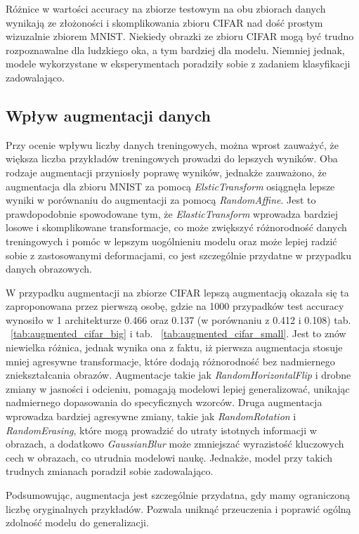 \documentclass[10pt]{article}
\begin{document}
Różnice w wartości accuracy na zbiorze testowym na obu zbiorach danych wynikają ze złożoności i skomplikowania zbioru CIFAR nad dość prostym wizuzalnie zbiorem MNIST.
Niekiedy obrazki ze zbioru CIFAR mogą być trudno rozpoznawalne dla ludzkiego oka, a tym bardziej dla modelu.
Niemniej jednak, modele wykorzystane w eksperymentach poradziły sobie z zadaniem klasyfikacji zadowalająco.

\subsection*{Wpływ augmentacji danych}
Przy ocenie wpływu liczby danych treningowych, można wprost zauważyć, że większa liczba przykładów treningowych prowadzi do lepszych wyników.
Oba rodzaje augmentacji przyniosły poprawę wyników, jednakże zauważono, że augmentacja dla zbioru MNIST za pomocą \textit{ElsticTransform} osiągnęła lepsze wyniki w porównaniu do augmentacji za pomocą \textit{RandomAffine}.
Jest to prawdopodobnie spowodowane tym, że \textit{ElasticTransform} wprowadza bardziej losowe i skomplikowane transformacje, co może zwiększyć różnorodność danych treningowych i pomóc w lepszym uogólnieniu modelu oraz może lepiej radzić sobie z zastosowanymi deformacjami, co jest szczególnie przydatne w przypadku danych obrazowych.

W przypadku augmentacji na zbiorze CIFAR lepszą augmentacją okazała się ta zaproponowana przez pierwszą osobę, gdzie na 1000 przypadków test accuracy wynosiło w 1 architekturze 0.466 oraz 0.137 (w porównaniu z 0.412 i 0.108) tab. ~\ref{tab:augmented_cifar_big} i tab. ~\ref{tab:augmented_cifar_small}.
Jest to znów niewielka różnica, jednak wynika ona z faktu, iż pierwsza augmentacja stosuje mniej agresywne transformacje, które dodają różnorodność bez nadmiernego zniekształcania obrazów.
Augmentacje takie jak \textit{RandomHorizontalFlip} i drobne zmiany w jasności i odcieniu, pomagają modelowi lepiej generalizować, unikając nadmiernego dopasowania do specyficznych wzorców.
Druga augmentacja wprowadza bardziej agresywne zmiany, takie jak \textit{RandomRotation} i \textit{RandomErasing}, które mogą prowadzić do utraty istotnych informacji w obrazach, a dodatkowo \textit{GaussianBlur} może zmniejszać wyrazistość kluczowych cech w obrazach, co utrudnia modelowi naukę.
Jednakże, model przy takich trudnych zmianach poradził sobie zadowalająco.

Podsumowując, augmentacja jest szczególnie przydatna, gdy mamy ograniczoną liczbę oryginalnych przykładów.
Pozwala uniknąć przeuczenia i poprawić ogólną zdolność modelu do generalizacji.
\end{document}
